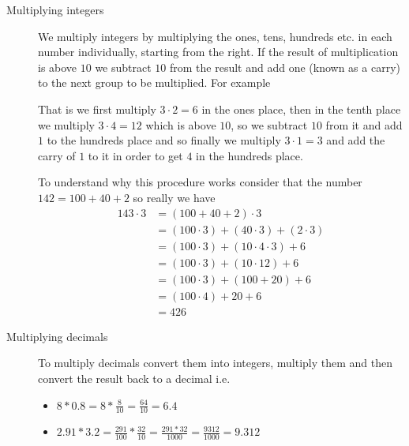 \begin{description}
\item [Multiplying integers] We multiply integers by multiplying the ones, tens, hundreds etc. in each number individually, starting from the right. If the result of multiplication is above $10$ we subtract $10$ from the result and add one (known as a carry) to the next group to be multiplied. For example
\begin{figure}[H]
\centering
{}
\end{figure}

That is we first multiply $3 \cdot 2 = 6$ in the ones place, then in the tenth place we multiply $3 \cdot 4 = 12$ which is above $10$, so we subtract $10$ from it and add $1$ to the hundreds place and so finally we multiply $3 \cdot 1 = 3$ and add the carry of $1$ to it in order to get $4$ in the hundreds place.

To understand why this procedure works consider that the number $142 = 100 + 40 + 2$ so really we have
\[
\begin{align}
143 \cdot 3 &= (100 + 40 + 2) \cdot 3  \\
            &= (100 \cdot 3) + (40 \cdot 3) + (2 \cdot 3)  \\
            &= (100 \cdot 3) + (10 \cdot 4 \cdot 3) + 6  \\
            &= (100 \cdot 3) + (10 \cdot 12) + 6  \\
            &= (100 \cdot 3) + (100 + 20) + 6  \\
            &= (100 \cdot 4) + 20 + 6  \\
            &= 426
\end{align}
\]

\item [Multiplying decimals] To multiply decimals convert them into integers, multiply them and then convert the result back to a decimal i.e.
\begin{itemize}
\item $8 * 0.8 = 8 * \frac{8}{10} = \frac{64}{10} = 6.4$
\item $2.91 * 3.2 = \frac{291}{100} * \frac{32}{10} = \frac{291 * 32}{1000} =
\frac{9312}{1000} = 9.312$
\end{itemize}
\end{description}

